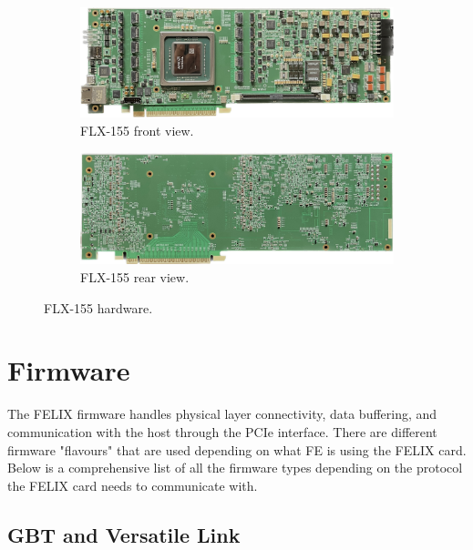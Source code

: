 \begin{figure}[H]
\centering
\begin{subfigure}[b]{0.7\textwidth}
    \centering
    \includegraphics[width=\textwidth]{images/felix/flx155_top.jpg}
    \caption{FLX-155 front view.}
    \label{fig:FLX-155-top}
\end{subfigure}

\vspace{0.2cm}

\begin{subfigure}[b]{0.7\textwidth}
    \centering
    \includegraphics[width=\textwidth]{images/felix/flx155_bot.jpg}
    \caption{FLX-155 rear view.}
    \label{fig:FLX-155-bot}
\end{subfigure}
\caption{FLX-155 hardware.}
\label{fig:FLX-155}
\end{figure}

\clearpage
\section{Firmware}
\label{sec:felix-firmware}

The \acs{FELIX} firmware handles physical layer connectivity, data buffering, and communication with the host through the \ac{PCIe} interface. There are different firmware "flavours" that are used depending on what \acl{FE} is using the \acs{FELIX} card.\\
Below is a comprehensive list of all the firmware types depending on the protocol the \acs{FELIX} card needs to communicate with.

\subsection{\acl{GBT} and Versatile Link}
\label{subsec:felix-gbt}

